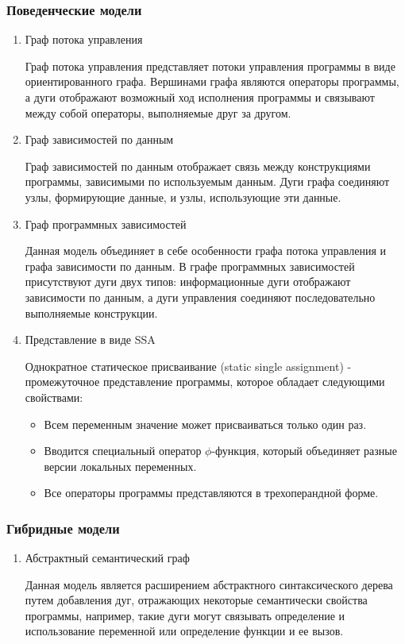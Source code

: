 \subsubsection{Поведенческие модели} %
\begin{enumerate}
    \item Граф потока управления

    Граф потока управления представляет потоки управления программы в виде
    ориентированного графа. Вершинами графа являются операторы программы, а дуги
    отображают возможный ход исполнения программы и связывают между собой
    операторы, выполняемые друг за другом.

    \item Граф зависимостей по данным

    Граф зависимостей по данным отображает связь между конструкциями программы,
    зависимыми по используемым данным. Дуги графа соединяют узлы, формирующие
    данные, и узлы, использующие эти данные.

    \item Граф программных зависимостей

    Данная модель объединяет в себе особенности графа потока управления и графа
    зависимости по данным. В графе программных зависимостей присутствуют дуги
    двух типов: информационные дуги отображают зависимости по данным, а
    дуги управления соединяют последовательно выполняемые конструкции.

    \item Представление в виде SSA

    Однократное статическое присваивание (static single assignment) -
    промежуточное представление программы, которое обладает следующими
    свойствами:
        \begin{itemize}
            \item Всем переменным значение может присваиваться только один раз.
            \item Вводится специальный оператор $\phi$-функция, который объединяет
            разные версии локальных переменных.
            \item Все операторы программы представляются в трехоперандной форме.
        \end{itemize}
\end{enumerate}

\subsubsection{Гибридные модели} %
\begin{enumerate}
    \item Абстрактный семантический граф

    Данная модель является расширением абстрактного синтаксического дерева путем
    добавления дуг, отражающих некоторые семантически свойства программы,
    например, такие дуги могут связывать определение и использование переменной
    или определение функции и ее вызов.
\end{enumerate}
